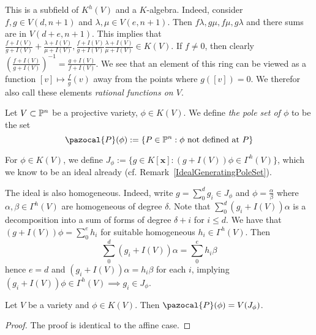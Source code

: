     \begin{remark}
        This is a subfield of $K^h(V)$ and a $K$-algebra. Indeed, consider $f,g\in V(d,n+1)$ and $\lambda,\mu\in V(e,n+1)$. Then $f\lambda, g\mu,f\mu,g\lambda$ and there sums are in $V(d+e,n+1)$. This implies that $\frac{f+I(V)}{g+I(V)}+\frac{\lambda+I(V)}{\mu+I(V)}, \frac{f+I(V)}{g+I(V)}\frac{\lambda +I(V)}{\mu+I(V)}\in K(V)$. If $f\neq 0$, then clearly $\left(\frac{f+I(V)}{g+I(V)}\right)^{-1}=\frac{g+I(V)}{f+I(V)}$. We see that an element of this ring can be viewed as a function $[v]\mapsto \frac{f}{g}(v)$ away from the points where $g([v])=0$. We therefor also call these elements \textit{rational functions on $V$}.
    \end{remark}
    \begin{definition}
        Let $V\subset \mathbb{P}^n$ be a projective variety, $\phi\in K(V)$. We define \textit{the pole set of $\phi$} to be the set
        $$\pazocal{P}(\phi):=\left\{ P\in \Pp^n :  \phi \text{ not defined at }P\right\}$$
    \end{definition}
    \begin{definition}
        For $\phi \in K(V)$, we define $J_\phi := \{g\in K[\mathbf{x}] : (g+I(V))\phi\in \Gamma^h(V)\}$, which we know to be an ideal already (cf. Remark~\ref{IdealGeneratingPoleSet}). 
    \end{definition}
    \begin{remark}
        The ideal is also homogeneous. Indeed, write $g=\sum_0^d g_i\in J_\phi$ and $\phi = \frac{\alpha}{\beta}$ where $\alpha,\beta\in \Gamma^h(V)$ are homogeneous of degree $\delta$.  Note that $\sum_0^d (g_i+I(V))\alpha$ is a decomposition into a sum of forms of degree $\delta+i$ for $i\leq d$. We have that $(g+I(V))\phi = \sum_0^e h_i$ for suitable homogeneous $h_i\in \Gamma^h(V)$. Then 
        $$\sum_0^d (g_i+I(V))\alpha = \sum_0^e h_i\beta$$
        hence $e=d$ and $(g_i+I(V))\alpha = h_i\beta$ for each $i$, implying $(g_i+I(V))\phi \in \Gamma^h(V)\implies g_i\in J_\phi$.
        \end{remark}
    \begin{lemma}\label{ProjectivePoleSetIsAlgebraic}
        Let $V$ be a variety and $\phi\in K(V)$. Then $\pazocal{P}(\phi)=V(J_\phi)$.
    \end{lemma}
    \begin{proof}
        The proof is identical to the affine case.
    \end{proof}
    
